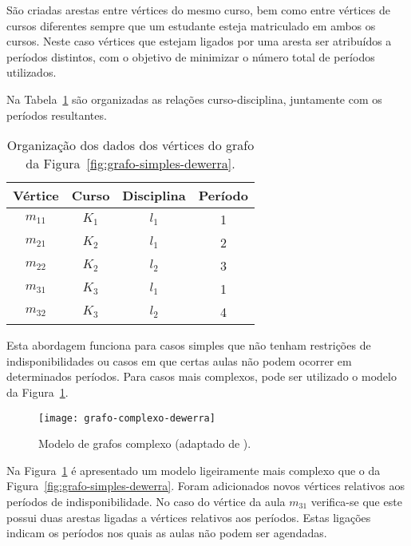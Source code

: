 São criadas arestas entre vértices do mesmo curso, bem como entre vértices de cursos diferentes sempre que um estudante esteja matriculado em ambos os cursos. Neste caso vértices que estejam ligados por uma aresta ser atribuídos a períodos distintos, com o objetivo de minimizar o número total de períodos utilizados.

Na Tabela~\ref{tabela:resumo-grafo-simples-dewerra} são organizadas as relações curso-disciplina, juntamente com os períodos resultantes.

\begin{table}[H]
    \centering
    \caption{Organização dos dados dos vértices do grafo da Figura~\ref{fig:grafo-simples-dewerra}.}
    \label{tabela:resumo-grafo-simples-dewerra}
    \begin{tabular}{cccc}
        \toprule
        \textbf{Vértice} & \textbf{Curso} & \textbf{Disciplina} & \textbf{Período} \\ \midrule
        $m_{11}$         & $K_{1}$        & $l_{1}$             & 1                \\
        $m_{21}$         & $K_{2}$        & $l_{1}$             & 2                \\
        $m_{22}$         & $K_{2}$        & $l_{2}$             & 3                \\
        $m_{31}$         & $K_{3}$        & $l_{1}$             & 1                \\
        $m_{32}$         & $K_{3}$        & $l_{2}$             & 4                \\
        \bottomrule
    \end{tabular}
\end{table}

Esta abordagem funciona para casos simples que não tenham restrições de indisponibilidades ou casos em que certas aulas não podem ocorrer em determinados períodos. Para casos mais complexos, pode ser utilizado o modelo da Figura~\ref{fig:grafo-complexo-dewerra}.

\begin{figure}[H]
    \centering
    \texttt{[image: grafo-complexo-dewerra]}
    \caption{Modelo de grafos complexo (adaptado de \cite{introductiontimetabling-Werra-1985}).}
    \label{fig:grafo-complexo-dewerra}
\end{figure}

Na Figura~\ref{fig:grafo-complexo-dewerra} é apresentado um modelo ligeiramente mais complexo que o da Figura~\ref{fig:grafo-simples-dewerra}. Foram adicionados novos vértices relativos aos períodos de indisponibilidade. No caso do vértice da aula $m_{31}$ verifica-se que este possui duas arestas ligadas a vértices relativos aos períodos. Estas ligações indicam os períodos nos quais as aulas não podem ser agendadas.

